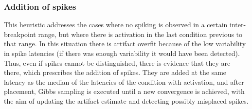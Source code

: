 \documentclass[12pt,letterpaper,fleqn]{article}
\begin{document}
\subsubsection{Addition of spikes}
This heuristic addresses the cases where no spiking is observed in a certain inter-breakpoint range, but where there is activation in the last condition previous to that range. In this situation there is artifact overfit because of the low variability in spike latencies (if there was enough variability it would have been detected). Thus, even if spikes cannot be distinguished, there is evidence that they are there, which prescribes the addition of spikes. They are added at the same latency as the median of the latencies of the condition with activation, and after placement, Gibbs sampling is executed until a new convergence is achieved, with the aim of updating the artifact estimate and detecting possibly misplaced spikes.
\pagebreak
\end{document}
